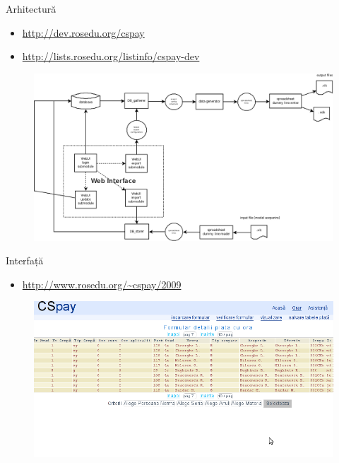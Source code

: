 \documentclass{beamer}
\begin{document}
\begin{frame}{Arhitectură}
    \begin{itemize}
	\pause \item \url{http://dev.rosedu.org/cspay}
	\pause \item \url{http://lists.rosedu.org/listinfo/cspay-dev}
    \end{itemize}
    \begin{figure}
	\pause \includegraphics[scale=0.25]{img/cspay-architecture.png}
    \end{figure}
\end{frame}

\begin{frame}{Interfață}
    \begin{itemize}
	\pause \item \url{http://www.rosedu.org/~cspay/2009}
    \end{itemize}
    \begin{figure}
	\pause \includegraphics[scale=0.40]{img/cspay-interface.png}
    \end{figure}
\end{frame}
\end{document}
